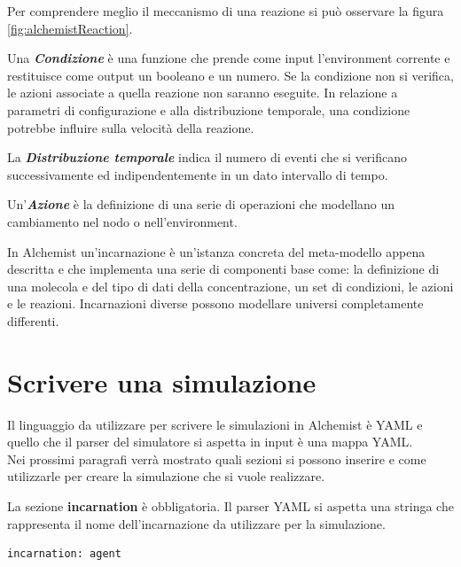 \documentclass[12pt,a4paper,openright,twoside]{report}
\begin{document}
Per comprendere meglio il meccanismo di una reazione si pu\`o osservare la figura \ref{fig:alchemistReaction}.

Una \textbf{\textit{Condizione}} \`e una funzione che prende come input l'environment corrente e restituisce come output un booleano e un numero. Se la condizione non si verifica, le azioni associate a quella reazione non saranno eseguite. In relazione a parametri di configurazione e alla distribuzione temporale, una condizione potrebbe influire sulla velocit\`a della reazione.

La \textbf{\textit{Distribuzione temporale}} indica il numero di eventi che si verificano successivamente ed indipendentemente in un dato intervallo di tempo.

Un'\textbf{\textit{Azione}} \`e la definizione di una serie di operazioni che modellano un cambiamento nel nodo o nell'environment.

In Alchemist un'incarnazione \`e un'istanza concreta del meta-modello appena descritta e che implementa una serie di componenti base come: la definizione di una molecola e del tipo di dati della concentrazione, un set di condizioni, le azioni e le reazioni. Incarnazioni diverse possono modellare universi completamente differenti.

\section{Scrivere una simulazione}
Il linguaggio da utilizzare per scrivere le simulazioni in Alchemist \`e YAML e quello che il parser del simulatore si aspetta in input \`e una mappa YAML.
\\
Nei prossimi paragrafi verr\`a mostrato quali sezioni si possono inserire e come utilizzarle per creare la simulazione che si vuole realizzare.

La sezione \textbf{incarnation} \`e obbligatoria. Il parser YAML si aspetta una stringa che rappresenta il nome dell'incarnazione da utilizzare per la simulazione.
\medskip
\begin{lstlisting}[firstnumber=last,caption={Incarnazione}]
  incarnation: agent
\end{lstlisting}
\end{document}
